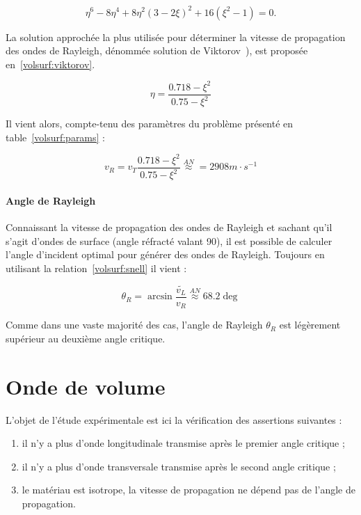 \begin{equation}
    \eta^6 - 8\eta^4 + 8\eta^2(3-2\xi)^2 + 16(\xi^2-1) = 0 \label{volsurf:rayleigh_eq}.
\end{equation}

La solution approchée la plus utilisée pour déterminer la vitesse de propagation des ondes
de Rayleigh, dénommée solution de Viktorov~\autocite{viktorov_rayleigh_1970}), est proposée en~\eqref{volsurf:viktorov}.

\begin{equation}
    \eta = \frac{0.718 - \xi^2}{0.75 - \xi^2} \label{volsurf:viktorov}
\end{equation}

Il vient alors, compte-tenu des paramètres du problème présenté en table~\ref{volsurf:params} :

\begin{equation}
    v_R = v_T\frac{0.718-\xi^2}{0.75-\xi^2} \overset{AN}{\approx} = 2908 m\cdot s^{-1} \label{volsurf:an_viktorov}
\end{equation}

\paragraph{Angle de Rayleigh} Connaissant la vitesse de propagation des ondes de Rayleigh et sachant qu'il s'agit d'ondes de surface (angle réfracté valant 90\degres), il est possible de calculer l'angle d'incident optimal pour générer des ondes de Rayleigh. Toujours en utilisant la relation~\eqref{volsurf:snell} il vient :

\begin{equation}
    \theta_{R} = \arcsin\frac{\tilde{v_L}}{v_R} \overset{AN}{\approx} 68.2\deg \label{volsurf:thetaR}
\end{equation}

Comme dans une vaste majorité des cas, l'angle de Rayleigh $\theta_R$ est légèrement supérieur au deuxième angle critique.

\section{Onde de volume}

\label{volsurf:vol}

L'objet de l'étude expérimentale est ici la vérification des assertions suivantes :

\begin{enumerate}
    \item il n'y a plus d'onde longitudinale transmise après le premier angle critique ;
    \item il n'y a plus d'onde transversale transmise après le second angle critique ;
    \item le matériau est isotrope, la vitesse de propagation ne dépend pas de l'angle de propagation.
\end{enumerate}

